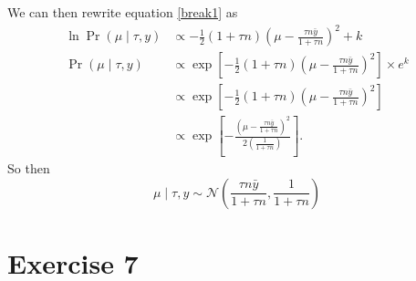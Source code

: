 \documentclass[letterpaper]{amsart}
\begin{document}
We can then rewrite equation \ref{break1} as
\begin{align}
  \ln
  \Pr(\mu\mid\tau, y)
  &\propto
    -\frac{1}{2}
    \left(1+\tau n\right)
    \left(\mu - \frac{\tau n\bar{y}}{1+\tau n}\right)^2
    + k
  \\
  \Pr(\mu\mid\tau, y)
  &\propto
    \exp\left[
    -\frac{1}{2}
    \left(1+\tau n\right)
    \left(\mu - \frac{\tau n\bar{y}}{1+\tau n}\right)^2
    \right]
    \times
    e^k
  \\
  &\propto
    \exp\left[
    -\frac{1}{2}
    \left(1+\tau n\right)
    \left(\mu - \frac{\tau n\bar{y}}{1+\tau n}\right)^2
    \right]
  \\
  &\propto
    \exp\left[
    -\frac{
    \left(\mu - \frac{\tau n\bar{y}}{1+\tau n}\right)^2
    }{
    2\left(\frac{1}{1+\tau n}\right)
    }
    \right].
\end{align}
So then
\begin{equation}
  \mu\mid\tau,y
  \sim \mathcal{N}\left(\frac{\tau n\bar{y}}{1+\tau n},
\frac{1}{1+\tau n}\right)
\end{equation}
\section*{Exercise 7}
\end{document}
